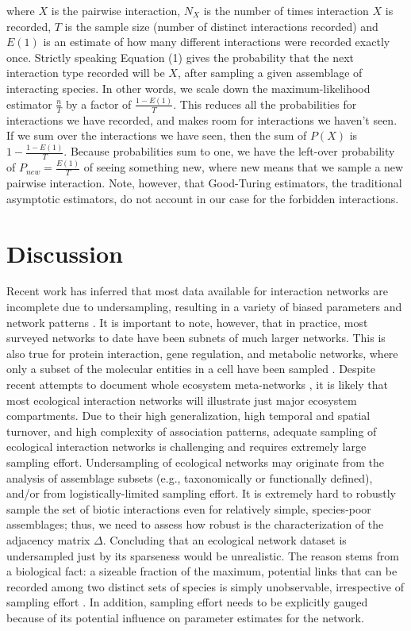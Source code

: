 \documentclass[12pt]{article}
\begin{document}
where $X$ is the pairwise interaction, $N_X$ is the number of times interaction $X$ is recorded, $T$ is the sample size (number of distinct interactions recorded) and $E(1)$ is an estimate of how many different interactions were recorded exactly once. Strictly speaking Equation (1) gives the probability that the next interaction type recorded will be $X$, after sampling a given assemblage of interacting species. In other words, we scale down the maximum-likelihood estimator $\frac{n}{T}$ by a factor of $\frac{1-E(1)}{T}$. This reduces all the probabilities for interactions we have recorded, and makes room for interactions we haven’t seen. If we sum over the interactions we have seen, then the sum of $P(X)$ is $1-\frac{1-E(1)}{T}$. Because probabilities sum to one, we have the left-over probability of
$P_{new}= \frac{E(1)}{T}$ of seeing something new, where new means that we sample a new pairwise interaction. Note, however, that Good-Turing estimators, the traditional asymptotic estimators, do not account in our case for the forbidden interactions. 

\section*{Discussion}
\label{discussion}
Recent work has inferred that most data available for interaction networks are incomplete due to undersampling, resulting in a variety of biased parameters and network patterns \citep{Chacoff:2012}. It is important to note, however, that in practice, most surveyed networks to date have been subnets of much larger networks. This is also true for protein interaction, gene regulation, and metabolic networks, where only a subset of the molecular entities in a cell have been sampled \citep{Stumpf:2005tn}. Despite recent attempts to document whole ecosystem meta-networks \citep{Pocock:2012ep}, it is likely that most ecological interaction networks will illustrate just major ecosystem compartments. Due to their high generalization, high temporal and spatial turnover, and high complexity of association patterns, adequate sampling of ecological interaction networks is challenging and requires extremely large sampling effort. Undersampling of ecological networks may originate from the analysis of assemblage subsets (e.g., taxonomically or functionally defined), and\slash or from logistically-limited sampling effort. It is extremely hard to robustly sample the set of biotic interactions even for relatively simple, species-poor assemblages; thus, we need to assess how robust is the characterization of the adjacency matrix $\Delta$. Concluding that an ecological network dataset is undersampled just by its sparseness would be unrealistic. The reason stems from a biological fact: a sizeable fraction of the maximum, potential links that can be recorded among two distinct sets of species is simply unobservable, irrespective of sampling effort \citep{E31/2562}. In addition, sampling effort needs to be explicitly gauged because of its potential influence on parameter estimates for the network. 
\end{document}
